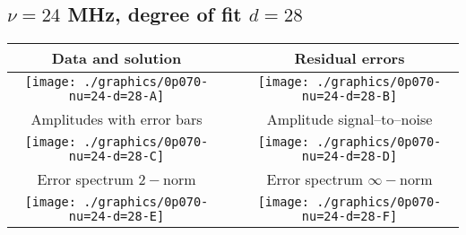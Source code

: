 

% 

\clearpage{}
\break{}

\subsection{$\nu = 24$ MHz, degree of fit $d = 28$}

\begin{table}[h]
    \begin{center}
        \begin{tabular}{ccc}
            Data and solution & \quad & Residual errors \\\hline
            \texttt{[image: ./graphics/0p070-nu=24-d=28-A]} &&
            \texttt{[image: ./graphics/0p070-nu=24-d=28-B]} \\[15pt]
            Amplitudes with error bars && Amplitude signal--to--noise \\\hline
            \texttt{[image: ./graphics/0p070-nu=24-d=28-C]} &&
            \texttt{[image: ./graphics/0p070-nu=24-d=28-D]} \\[15pt]
            Error spectrum $2-$norm && Error spectrum $\infty-$norm \\\hline
            \texttt{[image: ./graphics/0p070-nu=24-d=28-E]} &&
            \texttt{[image: ./graphics/0p070-nu=24-d=28-F]} \\[15pt]
        \end{tabular}
    \end{center}
\label{fig:elev=70, nu=24}
\end{table}



\endinput
